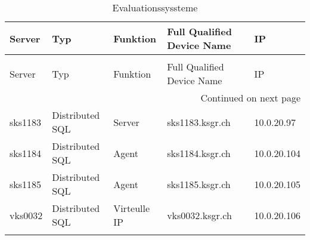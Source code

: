 \begin{longtable}[H]{lllll}

\toprule
Server & Typ & Funktion & Full Qualified Device Name & IP \\
\midrule
\endfirsthead
\caption[]{Evaluationssyssteme} \\
\toprule
Server & Typ & Funktion & Full Qualified Device Name & IP \\
\midrule
\endhead
\midrule
\multicolumn{5}{r}{Continued on next page} \\
\midrule
\endfoot
\bottomrule
\endlastfoot
sks1183 & Distributed SQL & Server & sks1183.ksgr.ch & 10.0.20.97 \\
sks1184 & Distributed SQL & Agent & sks1184.ksgr.ch & 10.0.20.104 \\
sks1185 & Distributed SQL & Agent & sks1185.ksgr.ch &  10.0.20.105 \\
vks0032 & Distributed SQL & Virteulle IP & vks0032.ksgr.ch & 10.0.20.106 \\
\caption{Evaluationssyssteme} \label{evaluation_inventory}
\end{longtable}
